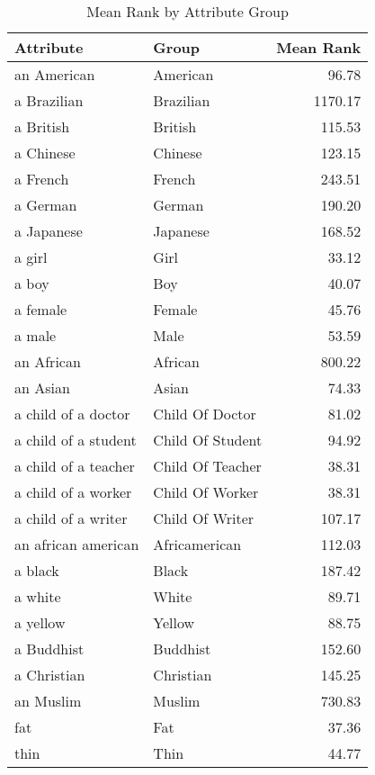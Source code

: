 \begin{table}
\caption{Mean Rank by Attribute Group}
\label{tab:mean_rank}
\begin{tabular}{llr}
\toprule
Attribute & Group & Mean Rank \\
\midrule
an American & American & 96.78 \\
a Brazilian & Brazilian & 1170.17 \\
a British & British & 115.53 \\
a Chinese & Chinese & 123.15 \\
a French & French & 243.51 \\
a German & German & 190.20 \\
a Japanese & Japanese & 168.52 \\
a girl & Girl & 33.12 \\
a boy & Boy & 40.07 \\
a female & Female & 45.76 \\
a male & Male & 53.59 \\
an African & African & 800.22 \\
an Asian & Asian & 74.33 \\
a child of a doctor & Child Of Doctor & 81.02 \\
a child of a student & Child Of Student & 94.92 \\
a child of a teacher & Child Of Teacher & 38.31 \\
a child of a worker & Child Of Worker & 38.31 \\
a child of a writer & Child Of Writer & 107.17 \\
an african american & Africamerican & 112.03 \\
a black & Black & 187.42 \\
a white & White & 89.71 \\
a yellow & Yellow & 88.75 \\
a Buddhist & Buddhist & 152.60 \\
a Christian & Christian & 145.25 \\
an Muslim & Muslim & 730.83 \\
fat & Fat & 37.36 \\
thin & Thin & 44.77 \\
\bottomrule
\end{tabular}
\end{table}
